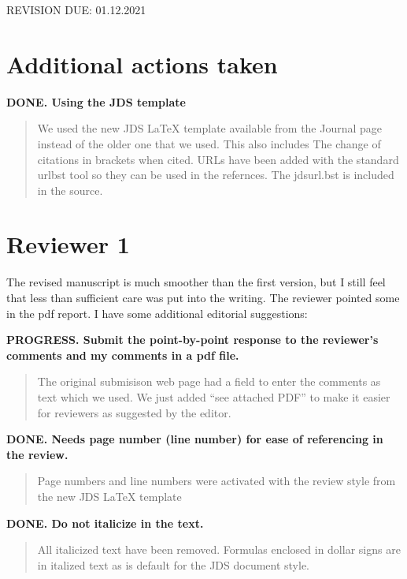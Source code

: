 


\newcommand{\REVIEW}[3]{
  \begin{tcolorbox}[colback={#1}]
    {\bf {#1}. {#2}}
 \end{tcolorbox}
  \begin{quote}
    {#3}
  \end{quote}
}

REVISION DUE: 01.12.2021




\section{Additional actions taken}


\REVIEW{DONE}{Using the JDS template} {We used the new JDS \LaTeX
  template available from the Journal page instead of the older one
  that we used. This also includes The change of citations in brackets
  when cited. URLs have been added with the standard urlbst tool so
  they can be used in the refernces. The jdsurl.bst is included in the
  source.}



\section*{Reviewer 1}

The revised manuscript is much smoother than the first version, but I
still feel that less than sufficient care was put into the
writing. The reviewer pointed some in the pdf report. I have some
additional editorial suggestions:

\bigskip

  \REVIEW{PROGRESS} {Submit the point-by-point response to the
    reviewer's comments and my comments in a pdf file.}{The original
    submisison web page had a field to enter the comments as text
    which we used. We just added ``see attached PDF'' to make it
    easier for reviewers as suggested by the editor.}

  \REVIEW{DONE} {Needs page number (line number) for ease of
    referencing in the review.}
  {Page numbers and line numbers were
    activated with the review style from the new JDS \LaTeX{}
    template}

  \REVIEW{DONE} {Do not italicize in the text.}
  {All italicized text
    have been removed.  Formulas enclosed in dollar signs are in
    italized text as is default for the JDS document style.}


